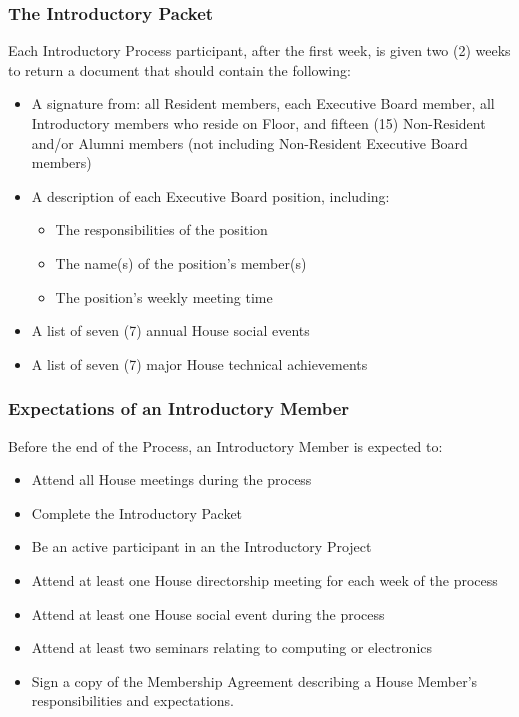 \documentclass{article}
\newcommand{\bsubsection}[1]{\subsubsection{#1} \label{#1}}
\begin{document}
\bsubsection{The Introductory Packet}
Each Introductory Process participant, after the first week, is given two (2) weeks to return a document that should contain the following:
\begin{itemize}
	\item A signature from: all Resident members, each Executive Board member, all Introductory members who reside on Floor, and fifteen (15) Non-Resident and/or Alumni members (not including Non-Resident Executive Board members)
	\item A description of each Executive Board position, including:
	\begin{itemize}
		\item The responsibilities of the position
		\item The name(s) of the position’s member(s)
		\item The position’s weekly meeting time
	\end{itemize}
	\item A list of seven (7) annual House social events
	\item A list of seven (7) major House technical achievements
\end{itemize}
\bsubsection{Expectations of an Introductory Member}
Before the end of the Process, an Introductory Member is expected to:
\begin{itemize}
\item Attend all House meetings during the process
\item Complete the Introductory Packet
\item Be an active participant in an the Introductory Project
\item Attend at least one House directorship meeting for each week of the process
\item Attend at least one House social event during the process
\item Attend at least two seminars relating to computing or electronics
\item Sign a copy of the Membership Agreement describing a House Member’s responsibilities and expectations.
\end{itemize}
\end{document}
